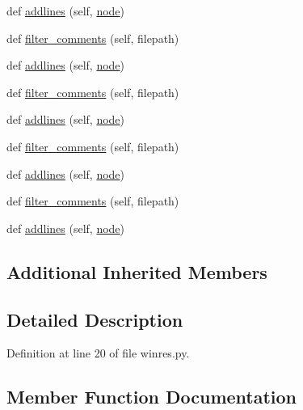 \begin{DoxyCompactItemize}
\item 
def \hyperlink{classwaflib_1_1_tools_1_1winres_1_1rc__parser_ad526be39acab6315dcb188e48d9d506e}{addlines} (self, \hyperlink{structnode}{node})
\item 
def \hyperlink{classwaflib_1_1_tools_1_1winres_1_1rc__parser_af948ecfd6555b3bf5134319a34f469a4}{filter\+\_\+comments} (self, filepath)
\item 
def \hyperlink{classwaflib_1_1_tools_1_1winres_1_1rc__parser_ad526be39acab6315dcb188e48d9d506e}{addlines} (self, \hyperlink{structnode}{node})
\item 
def \hyperlink{classwaflib_1_1_tools_1_1winres_1_1rc__parser_af948ecfd6555b3bf5134319a34f469a4}{filter\+\_\+comments} (self, filepath)
\item 
def \hyperlink{classwaflib_1_1_tools_1_1winres_1_1rc__parser_ad526be39acab6315dcb188e48d9d506e}{addlines} (self, \hyperlink{structnode}{node})
\item 
def \hyperlink{classwaflib_1_1_tools_1_1winres_1_1rc__parser_af948ecfd6555b3bf5134319a34f469a4}{filter\+\_\+comments} (self, filepath)
\item 
def \hyperlink{classwaflib_1_1_tools_1_1winres_1_1rc__parser_ad526be39acab6315dcb188e48d9d506e}{addlines} (self, \hyperlink{structnode}{node})
\item 
def \hyperlink{classwaflib_1_1_tools_1_1winres_1_1rc__parser_af948ecfd6555b3bf5134319a34f469a4}{filter\+\_\+comments} (self, filepath)
\item 
def \hyperlink{classwaflib_1_1_tools_1_1winres_1_1rc__parser_ad526be39acab6315dcb188e48d9d506e}{addlines} (self, \hyperlink{structnode}{node})
\end{DoxyCompactItemize}
\subsection*{Additional Inherited Members}


\subsection{Detailed Description}


Definition at line 20 of file winres.\+py.



\subsection{Member Function Documentation}
